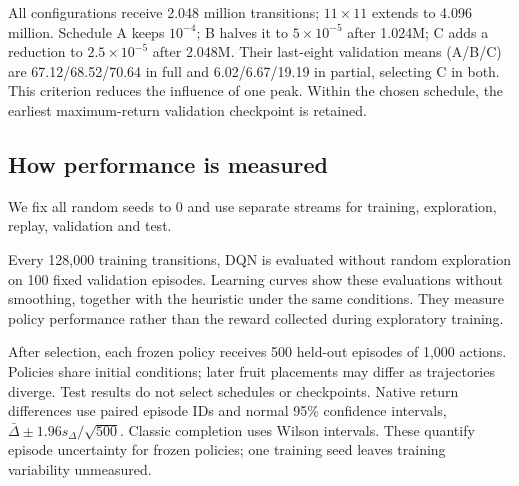 \documentclass{article}
\begin{document}
All configurations receive 2.048 million transitions; $11\times11$ extends to 4.096 million. Schedule A keeps $10^{-4}$; B halves it to $5\times10^{-5}$ after 1.024M; C adds a reduction to $2.5\times10^{-5}$ after 2.048M. Their last-eight validation means (A/B/C) are 67.12/68.52/70.64 in full and 6.02/6.67/19.19 in partial, selecting C in both. This criterion reduces the influence of one peak. Within the chosen schedule, the earliest maximum-return validation checkpoint is retained.

\newpage
\begin{samepage}
\subsection{How performance is measured}
We fix all random seeds to 0 and use separate streams for training, exploration, replay, validation and test.

Every 128,000 training transitions, DQN is evaluated without random exploration on 100 fixed validation episodes. Learning curves show these evaluations without smoothing, together with the heuristic under the same conditions. They measure policy performance rather than the reward collected during exploratory training.\par
\end{samepage}

After selection, each frozen policy receives 500 held-out episodes of 1,000 actions. Policies share initial conditions; later fruit placements may differ as trajectories diverge. Test results do not select schedules or checkpoints. Native return differences use paired episode IDs and normal 95\% confidence intervals, $\bar\Delta\pm1.96s_\Delta/\sqrt{500}$. Classic completion uses Wilson intervals. These quantify episode uncertainty for frozen policies; one training seed leaves training variability unmeasured.
\end{document}
